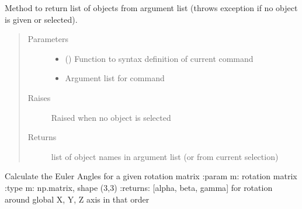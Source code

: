 \documentclass[letterpaper,10pt,english]{sphinxmanual}
\begin{document}
\begin{fulllineitems}
\label{\detokenize{pk_src.misc:pk_src.misc.getArgObj}}
Method to return list of objects from argument list (throws exception if no object is given or selected).
\begin{quote}\begin{description}
\item[{Parameters}] \leavevmode\begin{itemize}
\item {} 
 (\sphinxstyleliteralemphasis{ (}\sphinxstyleliteralemphasis{)}) \textendash{} Function to syntax definition of current command

\item {} 
 \textendash{} Argument list for command

\end{itemize}

\item[{Raises}] \leavevmode
{} \textendash{} Raised when no object is selected

\item[{Returns}] \leavevmode
list of object names in argument list (or from current selection)

\end{description}\end{quote}

\end{fulllineitems}


\begin{fulllineitems}
\label{\detokenize{pk_src.misc:pk_src.misc.getEulerAnglesToMatrix}}
Calculate the Euler Angles for a given rotation matrix
:param m: rotation matrix
:type m: np.matrix, shape (3,3)
:returns: {[}alpha, beta, gamma{]} for rotation around global X, Y, Z axis in that order

\end{fulllineitems}

\end{document}
